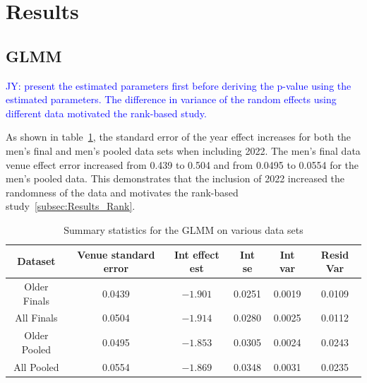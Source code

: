 \documentclass[12pt, letterpaper, titlepage]{article}
\newcommand{\jy}[1]{\textcolor{blue}{JY: #1}}
\begin{document}
\section{Results} \label{sec:Results}

\subsection{GLMM} \label{subsec:Results_GLMM}

\jy{present the estimated parameters first before deriving the p-value using the
  estimated parameters. The difference in variance of the random effects using
  different data motivated the rank-based study.}

As shown in table~\ref{tab:Gamma_parameters}, the standard error of the year
effect increases for both the men's final and men's pooled data sets when
including 2022.  The men's final data venue effect error increased from 0.439
to 0.504 and from 0.0495 to 0.0554 for the men's pooled data.  This demonstrates
that the inclusion of 2022 increased the randomness of the data and motivates
the rank-based study~\ref{subsec:Results_Rank}.

\begin{table}
  \centering
  \begin{tabular}{c c c c c c}
      \toprule
      Dataset & Venue standard error & Int effect est & Int se & Int var & Resid Var \\
      \midrule
      Older Finals & 0.0439 & $-1.901$ & 0.0251 & 0.0019 & 0.0109 \\
      All Finals & 0.0504 & $-1.914$ & 0.0280 & 0.0025 & 0.0112 \\
      Older Pooled & 0.0495 & $-1.853$ & 0.0305 & 0.0024 & 0.0243 \\
      All Pooled & 0.0554 & $-1.869$ & 0.0348 & 0.0031 & 0.0235 \\
      \bottomrule
  \end{tabular}
  \caption{Summary statistics for the GLMM on various data sets}
  \label{tab:Gamma_parameters}
\end{table}
\end{document}
